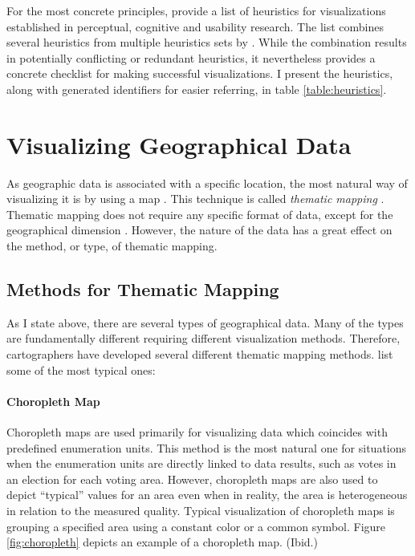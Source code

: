For the most concrete principles, \citet{zuk_heuristics_2006} provide a list of heuristics for visualizations established in perceptual, cognitive and usability research. The list combines several heuristics from multiple heuristics sets by \citet{shneiderman_eyes_1996,zuk_theoretical_2006,amar_knowledge_2004}. While the combination results in potentially conflicting or redundant heuristics, it nevertheless provides a concrete checklist for making successful visualizations. I present the heuristics, along with generated identifiers for easier referring, in table \ref{table:heuristics}.

\section{Visualizing Geographical Data}

As geographic data is associated with a specific location, the most natural way of visualizing it is by using a map \citep[chap.~1]{kraak_cartographic_1998,kraak_cartography_2011}. This technique is called \emph{thematic mapping} \citep[chap.~1]{slocum_thematic_2014}. Thematic mapping does not require any specific format of data, except for the geographical dimension \citep[chap.~1]{kraak_cartography_2011}. However, the nature of the data has a great effect on the method, or type, of thematic mapping.

\subsection{Methods for Thematic Mapping}
\label{subsection:mappingmethods}

As I state above, there are several types of geographical data. Many of the types are fundamentally different requiring different visualization methods. Therefore, cartographers have developed several different thematic mapping methods. \citet[chap.~14-18]{slocum_thematic_2014} list some of the most typical ones:

\paragraph{Choropleth Map}

Choropleth maps are used primarily for visualizing data which coincides with predefined enumeration units. This method is the most natural one for situations when the enumeration units are directly linked to data results, such as votes in an election for each voting area. However, choropleth maps are also used to depict ``typical'' values for an area even when in reality, the area is heterogeneous in relation to the measured quality. Typical visualization of choropleth maps is grouping a specified area using a constant color or a common symbol. Figure \ref{fig:choropleth} depicts an example of a choropleth map. (Ibid.)

